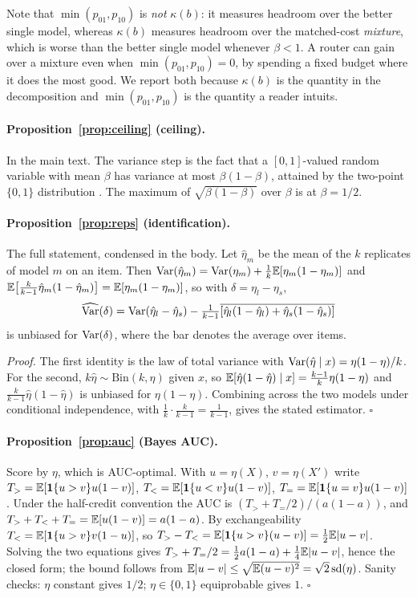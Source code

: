 \medskip
Note that $\min(p_{01},p_{10})$ is \emph{not} $\kappa(b)$: it measures headroom
over the better single model, whereas $\kappa(b)$ measures headroom over the
matched-cost \emph{mixture}, which is worse than the better single model whenever
$\beta<1$. A router can gain over a mixture even when $\min(p_{01},p_{10})=0$, by
spending a fixed budget where it does the most good. We report both because
$\kappa(b)$ is the quantity in the decomposition and $\min(p_{01},p_{10})$ is the
quantity a reader intuits.

\paragraph{Proposition~\ref{prop:ceiling} (ceiling).} In the main text.
The variance step is the fact that a $[0,1]$-valued random variable with mean
$\beta$ has variance at most $\beta(1-\beta)$, attained by the two-point
$\{0,1\}$ distribution \citep{bhatia2000variance}. The maximum of
$\sqrt{\beta(1-\beta)}$ over $\beta$ is at $\beta=1/2$.

\paragraph{Proposition~\ref{prop:reps} (identification).}
The full statement, condensed in the body. Let $\hat\eta_m$ be the mean of the
$k$ replicates of model $m$ on an item. Then
$\mathrm{Var}(\hat\eta_m)=\mathrm{Var}(\eta_m)+\tfrac1k\mathbb{E}[\eta_m(1-\eta_m)]$ and
$\mathbb{E}\bigl[\tfrac{k}{k-1}\hat\eta_m(1-\hat\eta_m)\bigr]=\mathbb{E}[\eta_m(1-\eta_m)]$,
so with $\delta=\eta_l-\eta_s$,
\[
\widehat{\mathrm{Var}}(\delta)=\mathrm{Var}(\hat\eta_l-\hat\eta_s)
-\tfrac{1}{k-1}\overline{\left[\hat\eta_l(1-\hat\eta_l)+\hat\eta_s(1-\hat\eta_s)\right]}
\]
is unbiased for $\mathrm{Var}(\delta)$, where the bar denotes the average over items.

\emph{Proof.} The first identity is the law of total variance with
$\mathrm{Var}(\hat\eta\mid x)=\eta(1-\eta)/k$. For the second, $k\hat\eta\sim
\mathrm{Bin}(k,\eta)$ given $x$, so
$\mathbb{E}[\hat\eta(1-\hat\eta)\mid x]=\frac{k-1}{k}\eta(1-\eta)$ and
$\frac{k}{k-1}\hat\eta(1-\hat\eta)$ is unbiased for $\eta(1-\eta)$. Combining
across the two models under conditional independence, with
$\frac1k\cdot\frac{k}{k-1}=\frac1{k-1}$, gives the stated estimator.
\hfill$\square$

\paragraph{Proposition~\ref{prop:auc} (Bayes AUC).}
Score by $\eta$, which is AUC-optimal. With $u=\eta(X)$, $v=\eta(X')$ write
$T_>=\mathbb{E}[\mathbf 1\{u>v\}u(1-v)]$, $T_<=\mathbb{E}[\mathbf 1\{u<v\}u(1-v)]$,
$T_==\mathbb{E}[\mathbf 1\{u=v\}u(1-v)]$. Under the half-credit convention the AUC is
$(T_>+T_=/2)/(a(1-a))$, and $T_>+T_<+T_==\mathbb{E}[u(1-v)]=a(1-a)$. By exchangeability
$T_<=\mathbb{E}[\mathbf 1\{u>v\}v(1-u)]$, so
$T_>-T_<=\mathbb{E}[\mathbf 1\{u>v\}(u-v)]=\tfrac12\mathbb{E}|u-v|$. Solving the two equations
gives $T_>+T_=/2=\tfrac12 a(1-a)+\tfrac14\mathbb{E}|u-v|$, hence the closed form; the
bound follows from $\mathbb{E}|u-v|\le\sqrt{\mathbb{E}(u-v)^2}=\sqrt2\,\mathrm{sd}(\eta)$.
Sanity checks: $\eta$ constant gives $1/2$; $\eta\in\{0,1\}$ equiprobable gives
$1$. \hfill$\square$

